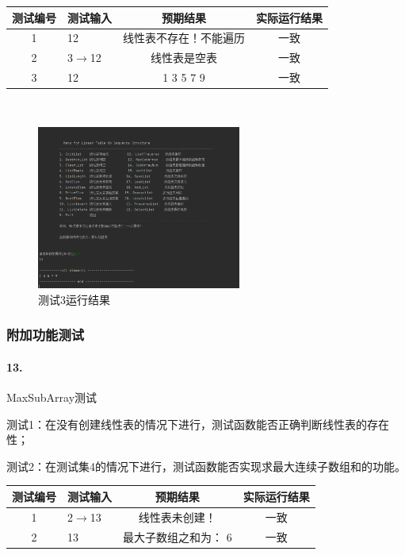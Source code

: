 \documentclass[supercite]{Experimental_Report}
\theoremstyle{definition}
\begin{document}
\begin{tabular}{|c|p{2.7cm}|c|c|}
	\hline
	测试编号 & 测试输入 & 预期结果 & 实际运行结果 \\
	\hline
	1 & 12 & 线性表不存在！不能遍历 & 一致 \\
	\hline
	2 & 3$\rightarrow$12 & 线性表是空表 & 一致 \\
	\hline
	3 & 12 & 1 3 5 7 9 & 一致 \\
	\hline
\end{tabular}

~\

 \begin{figure}[H]
 	\centering
 	\includegraphics[width=0.6\textwidth]{images/线性表测试12.png}
 	\caption{测试3运行结果}
 	\label{txlab}
 \end{figure}


\subsubsection{附加功能测试}

\paragraph{13.}MaxSubArray测试

测试1：在没有创建线性表的情况下进行，测试函数能否正确判断线性表的存在性；
	
测试2：在测试集4的情况下进行，测试函数能否实现求最大连续子数组和的功能。

\vspace{0.5em}

\begin{tabular}{|c|p{2.7cm}|c|c|}
	\hline
	测试编号 & 测试输入 & 预期结果 & 实际运行结果 \\
	\hline
	1 & 2$\rightarrow$13 & 线性表未创建！ & 一致 \\
	\hline
	2 & 13 & 最大子数组之和为： 6& 一致 \\
	\hline
\end{tabular}
\end{document}
